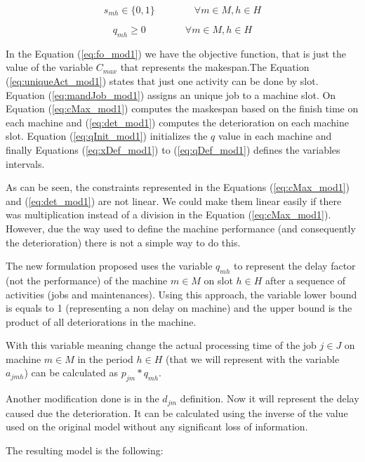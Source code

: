 \documentclass[a4paper,11pt]{article}
\begin{document}
\begin{equation}\label{eq:dDef_mod1}
    s_{mh} \in \{0,1\} \quad \quad \quad \quad \forall m \in M, h \in H
\end{equation}

\begin{equation}\label{eq:qDef_mod1}
    q_{mh} \geq 0 \quad \quad \quad \quad \forall  m \in M, h \in H
\end{equation}

In the Equation (\ref{eq:fo_mod1}) we have the objective function, that is just the value of the variable $C_{max}$ that represents the makespan.The Equation (\ref{eq:uniqueAct_mod1}) states that just one activity can be done by slot. Equation (\ref{eq:mandJob_mod1}) assigns an unique job to a machine slot. On Equation  (\ref{eq:cMax_mod1}) computes the maskespan based on the finish time on each machine and (\ref{eq:det_mod1}) computes the deterioration on each machine slot. Equation (\ref{eq:qInit_mod1}) initializes the $q$ value in each machine and finally Equations (\ref{eq:xDef_mod1}) to (\ref{eq:qDef_mod1}) defines the variables intervals. 

As can be seen, the constraints represented in the Equations (\ref{eq:cMax_mod1}) and (\ref{eq:det_mod1}) are not linear. We could make them linear easily if there was multiplication instead of a division in the Equation (\ref{eq:cMax_mod1}). However, due the way used to define the machine performance (and consequently the deterioration) there is not a simple way to do this.

The new formulation proposed uses the variable $q_{mh}$ to represent the delay factor (not the performance) of the machine $m \in M$ on slot $h \in H$ after a sequence of activities (jobs and maintenances). Using this approach, the variable lower bound is equals to 1 (representing a non delay on machine) and the upper bound is the product of all deteriorations in the machine. 

With this variable meaning change the actual processing time of the job $j \in J$ on machine $m \in M$ in the period $h \in H$ (that we will represent with the variable $a_{jmh}$) can be calculated as $p_{jm}*q_{mh}$. 

Another modification done is in the $d_{jm}$ definition. Now it will represent the delay caused due the deterioration. It can be calculated using the inverse of the value used on the original model without any significant loss of information.   

The resulting model is the following: 
\end{document}
